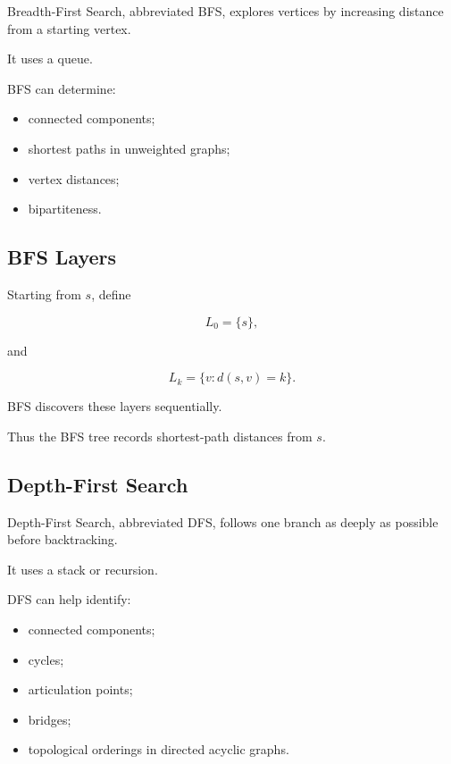 Breadth-First Search, abbreviated BFS, explores vertices by increasing
distance from a starting vertex.

It uses a queue.

BFS can determine:

\begin{itemize}
    \item connected components;
    \item shortest paths in unweighted graphs;
    \item vertex distances;
    \item bipartiteness.
\end{itemize}

\subsection{BFS Layers}
\label{subsec:bfs-layers}

Starting from \(s\), define

\[
L_0=\{s\},
\]

and

\[
\boxed{
L_k
=
\{v:d(s,v)=k\}.
}
\]

BFS discovers these layers sequentially.

Thus the BFS tree records shortest-path distances from \(s\).

\subsection{Depth-First Search}
\label{subsec:depth-first-search}

Depth-First Search, abbreviated DFS, follows one branch as deeply as
possible before backtracking.

It uses a stack or recursion.

DFS can help identify:

\begin{itemize}
    \item connected components;
    \item cycles;
    \item articulation points;
    \item bridges;
    \item topological orderings in directed acyclic graphs.
\end{itemize}


